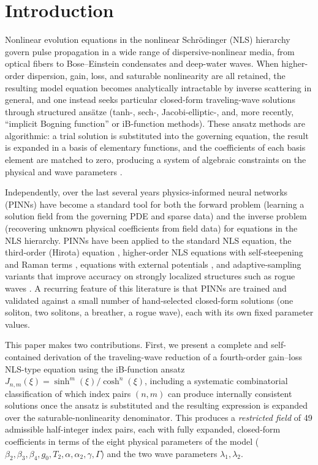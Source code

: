 \documentclass[11pt]{article}
\begin{document}
\tableofcontents

\section{Introduction}

Nonlinear evolution equations in the nonlinear Schr\"odinger (NLS) hierarchy govern
pulse propagation in a wide range of dispersive-nonlinear media, from optical fibers
to Bose--Einstein condensates and deep-water waves. When higher-order dispersion,
gain, loss, and saturable nonlinearity are all retained, the resulting model equation
becomes analytically intractable by inverse scattering in general, and one instead
seeks particular closed-form traveling-wave solutions through structured ans\"atze
(tanh-, sech-, Jacobi-elliptic-, and, more recently, ``implicit Bogning function''
or iB-function methods). These ansatz methods are algorithmic: a trial solution is
substituted into the governing equation, the result is expanded in a basis of
elementary functions, and the coefficients of each basis element are matched to
zero, producing a system of algebraic constraints on the physical and wave
parameters \citep{baldwin2004,hereman1990}.

Independently, over the last several years physics-informed neural networks (PINNs)
\citep{raissi2019} have become a standard tool for both the forward problem (learning
a solution field from the governing PDE and sparse data) and the inverse problem
(recovering unknown physical coefficients from field data) for equations in the NLS
hierarchy. PINNs have been applied to the standard NLS equation, the third-order
(Hirota) equation \citep{zhou2021}, higher-order NLS equations with self-steepening
and Raman terms \citep{fang2021}, equations with external potentials
\citep{pinnreview2025}, and adaptive-sampling variants that improve accuracy on
strongly localized structures such as rogue waves \citep{gravis2026}. A recurring
feature of this literature is that PINNs are trained and validated against a small
number of hand-selected closed-form solutions (one soliton, two solitons, a breather,
a rogue wave), each with its own fixed parameter values.

This paper makes two contributions. First, we present a complete and self-contained
derivation of the traveling-wave reduction of a fourth-order gain--loss NLS-type
equation using the iB-function ansatz $J_{n,m}(\xi)=\sinh^m(\xi)/\cosh^n(\xi)$, including
a systematic combinatorial classification of which index pairs $(n,m)$ can produce
internally consistent solutions once the ansatz is substituted and the resulting
expression is expanded over the saturable-nonlinearity denominator. This produces a
\emph{restricted field} of 49 admissible half-integer index pairs, each with fully
expanded, closed-form coefficients in terms of the eight physical parameters of the
model ($\beta_2,\beta_3,\beta_4,g_0,T_2,\alpha,\alpha_2,\gamma,\Gamma$) and the two
wave parameters $\lambda_1,\lambda_2$.
\end{document}
